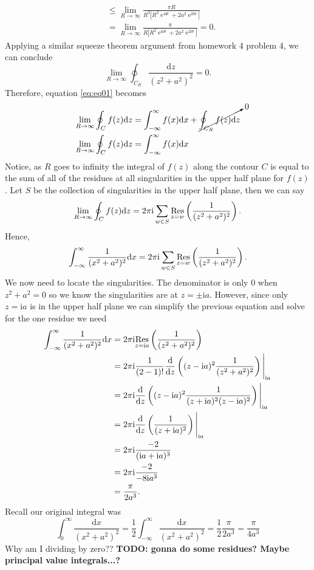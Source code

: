 \documentclass[10pt]{amsart}
\newcommand{\D}{\mathrm{d}}
\newcommand{\I}{\mathrm{i}}
\DeclareMathOperator{\E}{e}
\theoremstyle{nonumberplain}
\begin{document}
\begin{enumerate}[label={\bf {\arabic*}:}]
\begin{align*}
	&\leq \lim_{R\rightarrow\infty} \frac {\pi R} {R^2\left|R^2\E^{4\I\theta} + 2a^2\E^{2\I\theta} \right|} \\
	&= \lim_{R\rightarrow\infty} \frac {\pi} {R\left|R^2\E^{4\I\theta} + 2a^2\E^{2\I\theta} \right|} = 0.
\end{align*}
Applying a similar squeeze theorem argument from homework 4 problem 4, we can conclude
$$
\lim_{R\rightarrow\infty} \oint_{C_R} \frac {\D z}{ (z^2 + a^2)^2 } = 0.
$$
Therefore, equation \eqref{eq:eq01} becomes
\begin{align*}
\lim_{R\rightarrow\infty} \oint_C f(z) \D z &= \int_{-\infty}^\infty f(x) \D x + \cancelto{0}{\oint_{C_R} f(z) \D z} \\
\lim_{R\rightarrow\infty} \oint_C f(z) \D z &= \int_{-\infty}^\infty f(x) \D x
\end{align*}
Notice, as $R$ goes to infinity the integral of $f(z)$ along the contour $C$ is equal to the sum of all of the residues at all singularities in the upper half plane for $f(z)$.
Let $S$ be the collection of singularities in the upper half plane, then we can say
$$
\lim_{R\rightarrow\infty} \oint_C f(z) \D z
	= 2\pi \I \sum_{w \in S} \underset{z=w}{\rm Res} \left( \frac 1 { (z^2 + a^2)^2 } \right). 
$$
Hence,
$$
\int_{-\infty}^\infty \frac 1 {(x^2 + a^2)^2} \D x
	= 2\pi \I \sum_{w \in S} \underset{z=w}{\rm Res} \left( \frac 1 { (z^2 + a^2)^2 } \right).
$$
We now need to locate the singularities.
The denominator is only 0 when $z^2 + a^2 = 0$ so we know the singularities are at $z = \pm \I a$.
However, since only $z = \I a$ is in the upper half plane we can simplify the previous equation and solve for the one residue we need
\begin{align*}
\int_{-\infty}^\infty \frac 1 {(x^2 + a^2)^2} \D x
	&= 2\pi \I \underset{z=\I a}{\rm Res} \left( \frac 1 { (z^2 + a^2)^2 } \right) \\
	&= 2\pi \I \frac 1 {(2 - 1)!}\frac {\D}{\D z} \left((z - \I a)^2\frac 1 {(z^2 + a^2)^2} \right)\Bigg|_{\I a} \\
	&= 2\pi \I \frac {\D}{\D z} \left((z - \I a)^2\frac 1 {(z + \I a)^2(z - \I a)^2} \right)\Bigg|_{\I a} \\
	&= 2\pi \I \frac {\D}{\D z} \left(\frac 1 {(z + \I a)^2} \right)\Bigg|_{\I a} \\
	&= 2\pi \I \frac {-2} {(\I a + \I a)^3} \\
	&= 2\pi \I \frac {-2} {- 8 \I a^3} \\
	&= \frac \pi {2 a^3}.
\end{align*}
Recall our original integral was
$$
\int_0^\infty \frac {\D x}{ (x^2 + a^2)^2 }
	= \frac 1 2 \int_{-\infty}^\infty \frac {\D x}{ (x^2 + a^2)^2 }
	= \frac 1 2 \frac \pi {2 a^3}
	= \frac \pi {4a^3}
$$
Why am I dividing by zero??
\textbf{TODO: gonna do some residues? Maybe principal value integrals...?}
\begin{align*}
\end{align*}


\end{enumerate}
\end{document}
